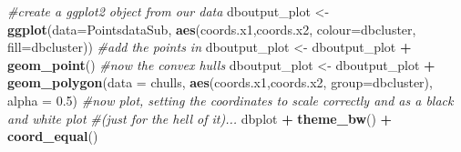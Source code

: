 \documentclass[
]{article}
\newenvironment{Shaded}{\begin{snugshade}}{\end{snugshade}}
\newcommand{\AttributeTok}[1]{\textcolor[rgb]{0.13,0.29,0.53}{#1}}
\newcommand{\CommentTok}[1]{\textcolor[rgb]{0.56,0.35,0.01}{\textit{#1}}}
\newcommand{\FloatTok}[1]{\textcolor[rgb]{0.00,0.00,0.81}{#1}}
\newcommand{\FunctionTok}[1]{\textcolor[rgb]{0.13,0.29,0.53}{\textbf{#1}}}
\newcommand{\NormalTok}[1]{#1}
\newcommand{\OtherTok}[1]{\textcolor[rgb]{0.56,0.35,0.01}{#1}}
\newcommand{\SpecialCharTok}[1]{\textcolor[rgb]{0.81,0.36,0.00}{\textbf{#1}}}
\begin{document}
\begin{Shaded}
\begin{Highlighting}[]
\CommentTok{\#create a ggplot2 object from our data}
\NormalTok{dboutput\_plot }\OtherTok{\textless{}{-}} \FunctionTok{ggplot}\NormalTok{(}\AttributeTok{data=}\NormalTok{PointsdataSub, }
                 \FunctionTok{aes}\NormalTok{(coords.x1,coords.x2, }\AttributeTok{colour=}\NormalTok{dbcluster, }\AttributeTok{fill=}\NormalTok{dbcluster)) }
\CommentTok{\#add the points in}
\NormalTok{dboutput\_plot }\OtherTok{\textless{}{-}}\NormalTok{ dboutput\_plot }\SpecialCharTok{+} \FunctionTok{geom\_point}\NormalTok{()}
\CommentTok{\#now the convex hulls}
\NormalTok{dboutput\_plot }\OtherTok{\textless{}{-}}\NormalTok{ dboutput\_plot }\SpecialCharTok{+} \FunctionTok{geom\_polygon}\NormalTok{(}\AttributeTok{data =}\NormalTok{ chulls, }
                                \FunctionTok{aes}\NormalTok{(coords.x1,coords.x2, }\AttributeTok{group=}\NormalTok{dbcluster), }
                                \AttributeTok{alpha =} \FloatTok{0.5}\NormalTok{) }
\CommentTok{\#now plot, setting the coordinates to scale correctly and as a black and white plot }
\CommentTok{\#(just for the hell of it)...}
\NormalTok{dbplot }\SpecialCharTok{+} \FunctionTok{theme\_bw}\NormalTok{() }\SpecialCharTok{+} \FunctionTok{coord\_equal}\NormalTok{()}
\end{Highlighting}
\end{Shaded}
\end{document}
